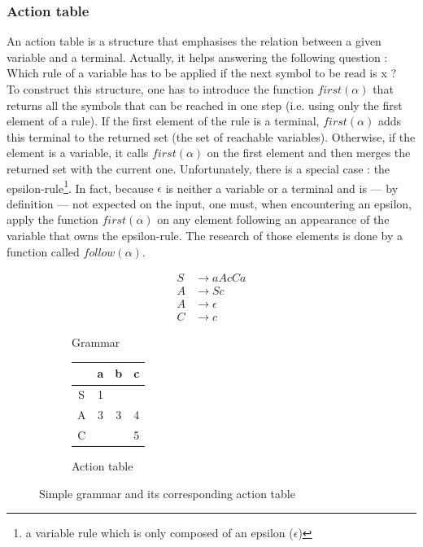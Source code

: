 \documentclass[a4paper,11pt]{article}
\begin{document}
    \subsubsection{Action table}
      \label{subsubsec:actionTable}
      An action table is a structure that emphasises the relation between a given variable and a terminal. Actually, it helps answering the following question : Which rule of a variable has to be applied if the next symbol to be read is x ?\\
      To construct this structure, one has to introduce the function $first(\alpha)$ that returns all the symbols that can be reached in one step (i.e. using only the first element of a rule). If the first element of the rule is a terminal, $first(\alpha)$ adds this terminal to the returned set (the set of reachable variables). Otherwise, if the element is a variable, it calls $first(\alpha)$ on the first element and then merges the returned set with the current one. Unfortunately, there is a special case : the epsilon-rule\footnote{a variable rule which is only composed of an epsilon ($\epsilon$)}. In fact, because $\epsilon$ is neither a variable or a terminal and is --- by definition --- not expected on the input, one must, when encountering an epsilon, apply the function $first(\alpha)$ on any element following an appearance of the variable that owns the epsilon-rule. The research of those elements is done by a function called $follow(\alpha)$.
      \begin{figure}[h!]
        \centering
        \begin{subfigure}[b]{0.4\textwidth}
            \centering
            \begin{align}
              S &\rightarrow aAcCa \\
              A &\rightarrow Sc \\
              A &\rightarrow \epsilon \\
              C &\rightarrow c
            \end{align}
            \caption{Grammar}
            \label{fig:simplegrammar}
        \end{subfigure}
        \begin{subfigure}[b]{0.4\textwidth}
            \centering
            \begin{tabular}{|c||c|c|c|}
              \hline
                & a & b & c \\
              \hline
              \hline
              S & 1 &   &   \\
              \hline
              A & 3 & 3 & 4 \\
              \hline
              C &   &   & 5 \\
              \hline
            \end{tabular}
            \caption{Action table}
            \label{fig:simplegrammaractiontable}
        \end{subfigure}
        \caption{Simple grammar and its corresponding action table}
        \label{}
      \end{figure}
      
\end{document}
